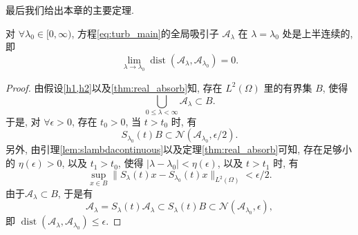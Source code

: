 \documentclass[oneside,longtitle]{LZUthesis}
\numberwithin{equation}{chapter}
\newcommand*\abs[1]{\lvert#1\rvert}
\newcommand*\norm[1]{\lVert#1\rVert}
\DeclareMathOperator{\dist}{dist}
\begin{document}
最后我们给出本章的主要定理.
\begin{theorem}
	对 $\forall \lambda_0 \in [0, \infty)$, 
	方程\cref{eq:turb_main}的全局吸引子 $\mathcal{A}_\lambda$ 在 $\lambda = \lambda_0$ 处是上半连续的, 即
	\begin{equation*}
		\lim_{\lambda \to \lambda_0} \dist(\mathcal{A}_\lambda, \mathcal{A}_{\lambda_0}) = 0.
	\end{equation*}
\end{theorem}
\begin{proof}
	由假设\cref{h1,h2}以及\cref{thm:real_absorb}知, 存在 $L^2(\Omega)$ 里的有界集 $B$, 使得
	\begin{equation*}
		\bigcup_{0 \leq \lambda < \infty} \mathcal{A}_\lambda \subset B.
	\end{equation*}
	于是, 对 $\forall \epsilon > 0$, 存在 $t_0 > 0$, 当 $t > t_0$ 时, 有
	\begin{equation*}
		S_{\lambda_0}(t)B \subset \mathcal{N}(\mathcal{A}_{\lambda_0}, \epsilon / 2).
	\end{equation*}
	另外, 由引理\ref{lem:slambdacontinuous}以及定理\ref{thm:real_absorb}可知,
	存在足够小的 $\eta(\epsilon) > 0$, 以及 $t_1 > t_0$, 使得 $\abs{\lambda - \lambda_0} < \eta(\epsilon)$, 以及 $t > t_1$ 时, 有
	\begin{equation*}
		\sup_{x \in B}\norm{S_\lambda(t)x - S_{\lambda_0}(t)x}_{L^2(\Omega)} < \epsilon / 2.
	\end{equation*}
	由于$\mathcal{A}_\lambda \subset B$, 于是有
	\begin{equation*}
		\mathcal{A}_\lambda = S_\lambda(t)\mathcal{A}_\lambda \subset S_\lambda(t)B \subset \mathcal{N}(\mathcal{A}_{\lambda_0}, \epsilon),
	\end{equation*}
	即 $\dist(\mathcal{A}_\lambda, \mathcal{A}_{\lambda_0}) \leq \epsilon$.
			
\end{proof}

\end{document}
